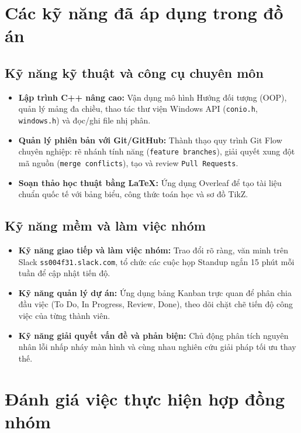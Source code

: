 \documentclass[12pt,a4paper]{article}
\begin{document}
\section{Các kỹ năng đã áp dụng trong đồ án}

\subsection{Kỹ năng kỹ thuật và công cụ chuyên môn}
\begin{itemize}
    \item \textbf{Lập trình C++ nâng cao:} Vận dụng mô hình Hướng đối tượng (OOP), quản lý mảng đa chiều, thao tác thư viện Windows API (\texttt{conio.h}, \texttt{windows.h}) và đọc/ghi file nhị phân.
    \item \textbf{Quản lý phiên bản với Git/GitHub:} Thành thạo quy trình Git Flow chuyên nghiệp: rẽ nhánh tính năng (\texttt{feature branches}), giải quyết xung đột mã nguồn (\texttt{merge conflicts}), tạo và review \texttt{Pull Requests}.
    \item \textbf{Soạn thảo học thuật bằng LaTeX:} Ứng dụng Overleaf để tạo tài liệu chuẩn quốc tế với bảng biểu, công thức toán học và sơ đồ TikZ.
\end{itemize}

\subsection{Kỹ năng mềm và làm việc nhóm}
\begin{itemize}
    \item \textbf{Kỹ năng giao tiếp và làm việc nhóm:} Trao đổi rõ ràng, văn minh trên Slack \texttt{ss004f31.slack.com}, tổ chức các cuộc họp Standup ngắn 15 phút mỗi tuần để cập nhật tiến độ.
    \item \textbf{Kỹ năng quản lý dự án:} Ứng dụng bảng Kanban trực quan để phân chia đầu việc (To Do, In Progress, Review, Done), theo dõi chặt chẽ tiến độ công việc của từng thành viên.
    \item \textbf{Kỹ năng giải quyết vấn đề và phản biện:} Chủ động phân tích nguyên nhân lỗi nhấp nháy màn hình và cùng nhau nghiên cứu giải pháp tối ưu thay thế.
\end{itemize}

\newpage

\section{Đánh giá việc thực hiện hợp đồng nhóm}
\end{document}
